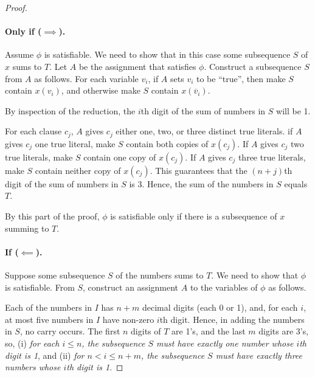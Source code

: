 \documentclass[11pt]{article}
\begin{document}
\begin{proof}
  \paragraph{Only if ($\implies$).}
  Assume $\phi$ is satisfiable.
  We need to show that in this case some subsequence $S$ of $x$ sums to $T$.
  Let $A$ be the assignment that satisfies $\phi$.
  Construct a subsequence $S$ from $A$ as follows.
  For each variable $v_i$,
  if $A$ sets $v_i$ to be ``true'',
  then make $S$ contain $x(v_i)$,
  and otherwise make $S$ contain $x(\overline v_i)$.

  By inspection of the reduction,
  the $i$th digit of the sum of numbers in $S$ will be 1.

  For each clause $c_j$,
  $A$ gives $c_j$ either one, two, or three distinct true literals.
  if $A$ gives $c_j$ one true literal,
  make $S$ contain both copies of $x(c_j)$. 
  If $A$ gives $c_j$ two true literals,
  make $S$ contain one copy of $x(c_j)$. 
  If $A$ gives $c_j$ three true literals,
  make $S$ contain neither copy of $x(c_j)$. 
  This guarantees that the $(n+j)$th digit of the sum of numbers in $S$ is 3. 
  Hence, the sum of the numbers in $S$ equals $T$.

  By this part of the proof,
  $\phi$ is satisfiable only if
  there is a subsequence of $x$ summing to $T$.

  \paragraph{If ($\impliedby$).}
  Suppose some subsequence $S$ of the numbers sums to $T$.
  We need to show that $\phi$ is satisfiable.
  From $S$, construct an assignment $A$ to the variables of $\phi$ as follows.
  
  Each of the numbers in $I$ has $n+m$ decimal digits (each 0 or 1),
  and, for each $i$, at most five numbers in $I$ have non-zero $i$th digit.
  Hence, in adding the numbers in $S$, no carry occurs.
  The first $n$ digits of $T$ are 1's, and the last $m$ digits are 3's,
  so, (i) \emph{for each $i\le n$, the subsequence $S$ must have exactly one
  number whose $i$th digit is 1},
  and (ii) \emph{for $n< i \le n+m$, the subsequence $S$ must have exactly three
  numbers whose $i$th digit is 1}.


\end{proof}
\end{document}

